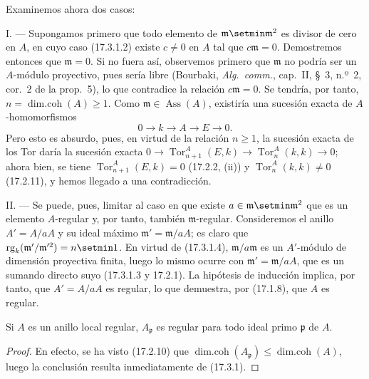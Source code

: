 Examinemos ahora dos casos:

\medskip\noindent I. --- Supongamos primero que todo elemento de
$\mathfrak{m}\setmin\mathfrak{m}^2$ es divisor de cero en $A$, en cuyo caso
(17.3.1.2) existe $c\neq0$ en $A$ tal que $c\mathfrak{m}=0$. Demostremos
entonces que $\mathfrak{m}=0$. Si no fuera así, observemos primero que
$\mathfrak{m}$ no podría ser un $A$-módulo proyectivo, pues sería libre
(Bourbaki, \emph{Alg.~comm.}, cap.~II, \S~3, n.º~2, cor.~2 de la prop.~5),
lo que contradice la relación $c\mathfrak{m}=0$. Se tendría, por tanto,
$n=\operatorname{dim.coh}(A)\geq1$. Como
$\mathfrak{m}\in\operatorname{Ass}(A)$, existiría una sucesión exacta de
$A$-homomorfismos
\[
  0\longrightarrow k\longrightarrow A\longrightarrow E\longrightarrow0.
\]
Pero esto es absurdo, pues, en virtud de la relación $n\geq1$, la sucesión
exacta de los Tor daría la sucesión exacta
$0\longrightarrow\operatorname{Tor}^A_{n+1}(E,k)\longrightarrow
\operatorname{Tor}^A_n(k,k)\longrightarrow0$; ahora bien, se tiene
$\operatorname{Tor}^A_{n+1}(E,k)=0$ (17.2.2, (ii)) y
$\operatorname{Tor}^A_n(k,k)\neq0$ (17.2.11), y hemos llegado a una
contradicción.

\medskip\noindent II. --- Se puede, pues, limitar al caso en que
existe $a\in\mathfrak{m}\setmin\mathfrak{m}^2$ que es un elemento $A$-regular y, por
tanto, también $\mathfrak{m}$-regular. Consideremos el anillo $A'=A/aA$ y su
ideal
máximo $\mathfrak{m}'=\mathfrak{m}/aA$; es claro que
$\operatorname{rg}_k(\mathfrak{m}'/\mathfrak{m}'^2)=n\setmin 1$. En virtud de
(17.3.1.4), $\mathfrak{m}/a\mathfrak{m}$ es un $A'$-módulo de dimensión
proyectiva finita, luego lo mismo ocurre con
$\mathfrak{m}'=\mathfrak{m}/aA$, que es un sumando directo suyo (17.3.1.3 y
17.2.1). La hipótesis de inducción implica, por tanto, que $A'=A/aA$ es
regular, lo que demuestra, por (17.1.8), que $A$ es regular.

\begin{corollary}[17.3.2]
\label{0.17.3.2-fr}
Si $A$ es un anillo local regular, $A_{\mathfrak{p}}$ es regular para todo
ideal primo $\mathfrak{p}$ de $A$.
\end{corollary}

\begin{proof}
En efecto, se ha visto (17.2.10) que
$\operatorname{dim.coh}(A_{\mathfrak{p}})\leq
\operatorname{dim.coh}(A)$, luego la conclusión resulta inmediatamente de
(17.3.1).
\end{proof}

